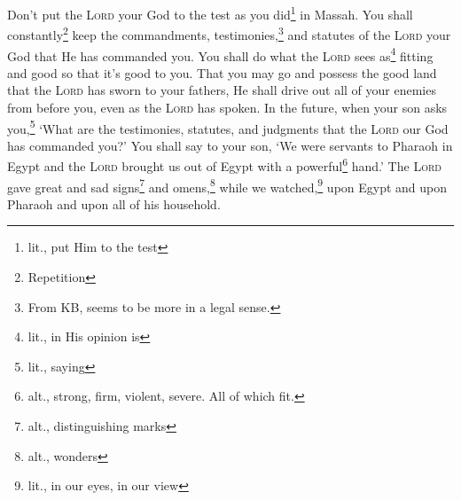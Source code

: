 \begin{inparaenum}
     Don't put the \textsc{Lord} your God to the test as you did\footnote{lit., put Him to the test} in Massah.%
     You shall constantly\footnote{Repetition} keep the commandments, testimonies,\footnote{From KB, seems to be more in a legal sense.} and statutes of the \textsc{Lord} your God that He has commanded you.%
     You shall do what the \textsc{Lord} sees as\footnote{lit., in His opinion is} fitting and good so that it's good to you. That you may go and possess the good land that the \textsc{Lord} has sworn to your fathers,%
     He shall drive out all of your enemies from before you, even as the \textsc{Lord} has spoken.%
     In the future, when your son asks you,\footnote{lit., saying} `What are the testimonies, statutes, and judgments that the \textsc{Lord} our God has commanded you?'%
     You shall say to your son, `We were servants to Pharaoh in Egypt and the \textsc{Lord} brought us out of Egypt with a powerful\footnote{alt., strong, firm, violent, severe. All of which fit.} hand.'%
     The \textsc{Lord} gave great and sad signs\footnote{alt., distinguishing marks} and omens,\footnote{alt., wonders} while we watched,\footnote{lit., in our eyes, in our view} upon Egypt and upon Pharaoh and upon all of his household.%
\end{inparaenum}
